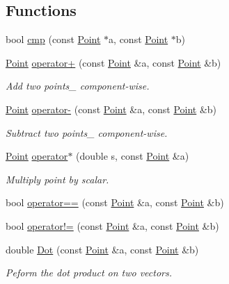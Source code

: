 \subsection*{Functions}
\begin{DoxyCompactItemize}
\item 
bool \hyperlink{namespacep2t_ab82db1108f5abd29df4537180f6e639c}{cmp} (const \hyperlink{structp2t_1_1_point}{Point} $\ast$a, const \hyperlink{structp2t_1_1_point}{Point} $\ast$b)
\item 
\hyperlink{structp2t_1_1_point}{Point} \hyperlink{namespacep2t_a98db07c78d588aa4e68ffdaadd503d45}{operator+} (const \hyperlink{structp2t_1_1_point}{Point} \&a, const \hyperlink{structp2t_1_1_point}{Point} \&b)
\begin{DoxyCompactList}\small\item\em Add two points\+\_\+ component-\/wise. \end{DoxyCompactList}\item 
\hyperlink{structp2t_1_1_point}{Point} \hyperlink{namespacep2t_adebd7f2104fff7945192e249aaeed77f}{operator-\/} (const \hyperlink{structp2t_1_1_point}{Point} \&a, const \hyperlink{structp2t_1_1_point}{Point} \&b)
\begin{DoxyCompactList}\small\item\em Subtract two points\+\_\+ component-\/wise. \end{DoxyCompactList}\item 
\hyperlink{structp2t_1_1_point}{Point} \hyperlink{namespacep2t_a4f005ffa2a5d03029a3619fb8110c4a9}{operator$\ast$} (double s, const \hyperlink{structp2t_1_1_point}{Point} \&a)
\begin{DoxyCompactList}\small\item\em Multiply point by scalar. \end{DoxyCompactList}\item 
bool \hyperlink{namespacep2t_ac84d990aed3d2218987d6846a8249fb8}{operator==} (const \hyperlink{structp2t_1_1_point}{Point} \&a, const \hyperlink{structp2t_1_1_point}{Point} \&b)
\item 
bool \hyperlink{namespacep2t_aef209c6c873f146ba2c2ff1f2174f9f6}{operator!=} (const \hyperlink{structp2t_1_1_point}{Point} \&a, const \hyperlink{structp2t_1_1_point}{Point} \&b)
\item 
double \hyperlink{namespacep2t_a7f992d12c1c4fecfd9914e9f6d871f2d}{Dot} (const \hyperlink{structp2t_1_1_point}{Point} \&a, const \hyperlink{structp2t_1_1_point}{Point} \&b)
\begin{DoxyCompactList}\small\item\em Peform the dot product on two vectors. \end{DoxyCompactList}\item 

\end{DoxyCompactItemize}
